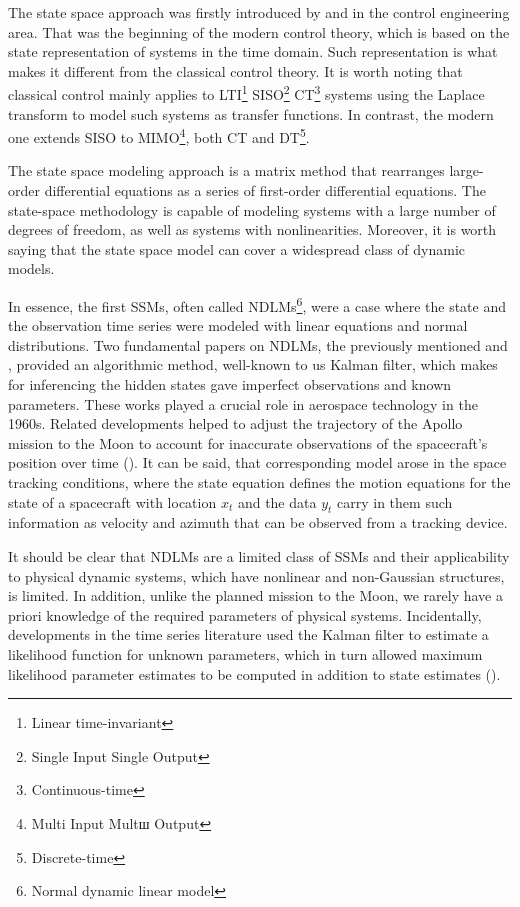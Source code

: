 The state space approach was firstly introduced by \textcite{kalman_new_1960} and \textcite{zadeh_linear_1963} in the control engineering area. That was the beginning of the modern control theory, which is based on the state representation of systems in the time domain. Such representation is what makes it different from the classical control theory. It is worth noting that classical control mainly applies to LTI\footnote{Linear time-invariant} SISO\footnote{Single Input Single Output} CT\footnote{Continuous-time} systems using the Laplace transform to model such systems as transfer functions. In contrast, the modern one extends SISO to MIMO\footnote{Multi Input Multш Output}, both CT and DT\footnote{Discrete-time}.

The state space modeling approach is a matrix method that rearranges large-order differential equations as a series of first-order differential equations. The state-space methodology is capable of modeling systems with a large number of degrees of freedom, as well as systems with nonlinearities. Moreover, it is worth saying that the state space model can cover a widespread class of dynamic models.

In essence, the first SSMs, often called NDLMs\footnote{Normal dynamic linear model}, were a case where the state and the observation time series were modeled with linear equations and normal distributions. Two fundamental papers on NDLMs, the previously mentioned \textcite{kalman_new_1960} and \textcite{zadeh_linear_1963}, provided an algorithmic method, well-known to us Kalman filter, which makes for inferencing the hidden states gave imperfect observations and known parameters.
These works played a crucial role in aerospace technology in the 1960s. Related developments helped to adjust the trajectory of the Apollo mission to the Moon to account for inaccurate observations of the spacecraft's position over time (\textcite{grewal_applications_2010}). It can be said, that corresponding model arose in the space tracking conditions, where the state equation defines the motion equations for the state of a spacecraft with location \(x_t\) and the data \(y_t\) carry in them such information as velocity and azimuth that can be observed from a tracking device.

It should be clear that NDLMs are a limited class of SSMs and their applicability to physical dynamic systems, which have nonlinear and non-Gaussian structures, is limited. In addition, unlike the planned mission to the Moon, we rarely have a priori knowledge of the required parameters of physical systems. Incidentally, developments in the time series literature used the Kalman filter to estimate a likelihood function for unknown parameters, which in turn allowed maximum likelihood parameter estimates to be computed in addition to state estimates (\textcite{harvey_forecasting_1990}).

